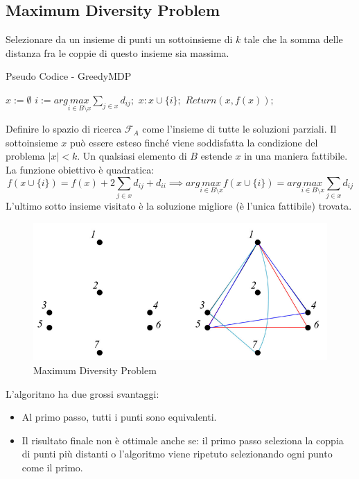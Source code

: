 \documentclass{article}
\begin{document}
    \subsection{Maximum Diversity Problem}
    Selezionare da un insieme di punti un sottoinsieme di $k$ tale che la somma delle distanza
    fra le coppie di questo insieme sia massima.
    \begin{algorithm}[H]
        \caption{Pseudo Codice - GreedyMDP}
        \begin{algorithmic}
            \State $x:=\emptyset$
            \State $i:=arg\underset{i \in B\setminus x}{max}\sum_{j\in x}d_{ij};$
            \State $x:x\cup\{i\};$
            \EndWhile
            \State $Return(x,f(x));$
        \end{algorithmic}
    \end{algorithm}

    Definire lo spazio di ricerca $\mathcal{F}_A$ come l'insieme di tutte le soluzioni parziali. Il
    sottoinsieme $x$ può essere esteso finché viene soddisfatta la condizione del problema $|x|<k$.
    Un qualsiasi elemento di $B$ estende $x$ in una maniera fattibile. La funzione obiettivo è quadratica:
    $$f(x\cup\{i\})=f(x)+2\sum_{j\in x}d_{ij}+d_{ii}\implies arg\underset{i\in B\setminus x}{max}f(x\cup \{i\})=arg\underset{i\in B\setminus x}{max}\sum_{j\in x} d_{ij}$$
    L'ultimo sotto insieme visitato è la soluzione migliore (è l'unica fattibile) trovata.

    \begin{figure}[H]
        \centering
        \includegraphics[scale=0.5]{images/MDP_construct.png}
        \caption{Maximum Diversity Problem}
    \end{figure}

    L'algoritmo ha due grossi svantaggi:
    \begin{itemize}
        \item Al primo passo, tutti i punti sono equivalenti.
        \item Il risultato finale non è ottimale anche se: il primo passo seleziona la coppia di
              punti più distanti o l'algoritmo viene ripetuto selezionando ogni punto come il primo.
    \end{itemize}
\end{document}
